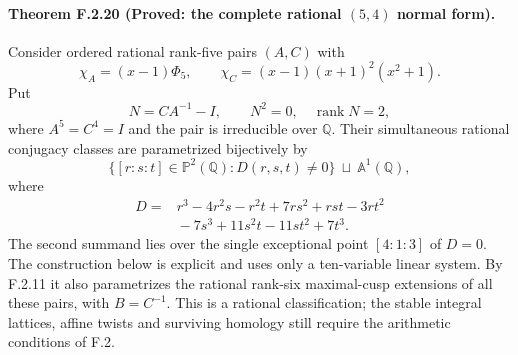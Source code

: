 \paragraph{Theorem F.2.20 (Proved: the complete rational $(5,4)$ normal form).}
Consider ordered rational rank-five pairs $(A,C)$ with
\[
 \chi_A=(x-1)\Phi_5,
 \qquad \chi_C=(x-1)(x+1)^2(x^2+1).
\]
Put
\[
 N=CA^{-1}-I,
 \qquad N^2=0,\quad\operatorname{rank}N=2,
\]
where $A^5=C^4=I$ and the pair is irreducible over $\mathbb Q$.
Their simultaneous rational conjugacy classes are parametrized
bijectively by
\[
 \bigl\{[r:s:t]\in\mathbb P^2(\mathbb Q):D(r,s,t)\ne0\bigr\}
 \ \sqcup\ \mathbb A^1(\mathbb Q),
 \tag{F.R1}
\]
where
\[
\begin{split}
 D={}&r^3-4r^2s-r^2t+7rs^2+rst-3rt^2\\
     &{}-7s^3+11s^2t-11st^2+7t^3.
\end{split}
 \tag{F.R2}
\]
The second summand lies over the single exceptional point
$[4:1:3]$ of $D=0$.  The construction below is explicit and
uses only a ten-variable linear system.  By F.2.11 it also
parametrizes the rational rank-six maximal-cusp extensions
of all these pairs, with $B=C^{-1}$.
This is a rational classification; the stable integral
lattices, affine twists and surviving homology still require
the arithmetic conditions of F.2.

